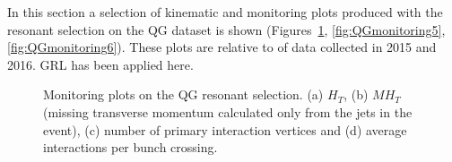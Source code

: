 In this section a selection of kinematic and monitoring plots produced with the resonant selection on the QG dataset is shown 
(Figures~\ref{fig:QGmonitoring1},  
\ref{fig:QGmonitoring5}, \ref{fig:QGmonitoring6}). These plots are relative to \integLumi of data collected in 2015 and 2016.
 GRL has been applied here.

\begin{figure}[htb]
 \centering

 \caption{Monitoring plots on %
 the QG resonant selection. (a) $H_T$, (b) $MH_T$ (missing transverse momentum calculated only from the jets in the event), (c) number of primary interaction vertices and (d) average interactions per bunch crossing.}
 \label{fig:QGmonitoring1}
\end{figure}


